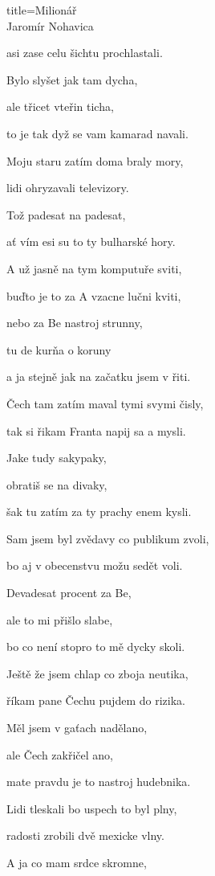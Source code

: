 \begin{song}{title=\centering Milionář \\\normalsize Jaromír Nohavica  \vspace*{-0.3cm}}
{\begin{minipage}[t]{0.48\textwidth}
asi zase celu šichtu prochlastali.

Bylo slyšet jak tam dycha, 

ale třicet vteřin ticha, 

to je tak dyž se vam kamarad navali.

\sloka
Moju staru zatím doma braly mory,

lidi ohryzavali televizory.

Tož padesat na padesat, 

ať vím esi su to ty bulharské hory.

\end{minipage}\begin{minipage}[t]{0.48\textwidth}\setlength{\parindent}{0.45cm}\vspace*{0.55cm}  %


\sloka
A už jasně na tym komputuře sviti, 

buďto je to za A vzacne lučni kviti, 

nebo za Be nastroj strunny, 

tu de kurňa o koruny 

a ja stejně jak na začatku jsem v řiti.

\sloka
Čech tam zatím maval tymi svymi čisly,

tak si řikam Franta napij sa a mysli. 

Jake tudy sakypaky, 

obratiš se na divaky,

šak tu zatím za ty prachy enem kysli. 

\sloka
Sam jsem byl zvědavy co publikum zvoli, 

bo aj v obecenstvu možu sedět voli. 

Devadesat procent za Be, 

ale to mi přišlo slabe, 

bo co není stopro to mě dycky skoli. 

\sloka
Ještě že jsem chlap co zboja neutika, 

říkam pane Čechu pujdem do rizika. 

Měl jsem v gaťach nadělano, 

ale Čech zakřičel ano, 

mate pravdu je to nastroj hudebnika.

\sloka 
Lidi tleskali bo uspech to byl plny, 

radosti zrobili dvě mexicke vlny. 

A ja co mam srdce skromne, 


\end{minipage}}
\end{song}
